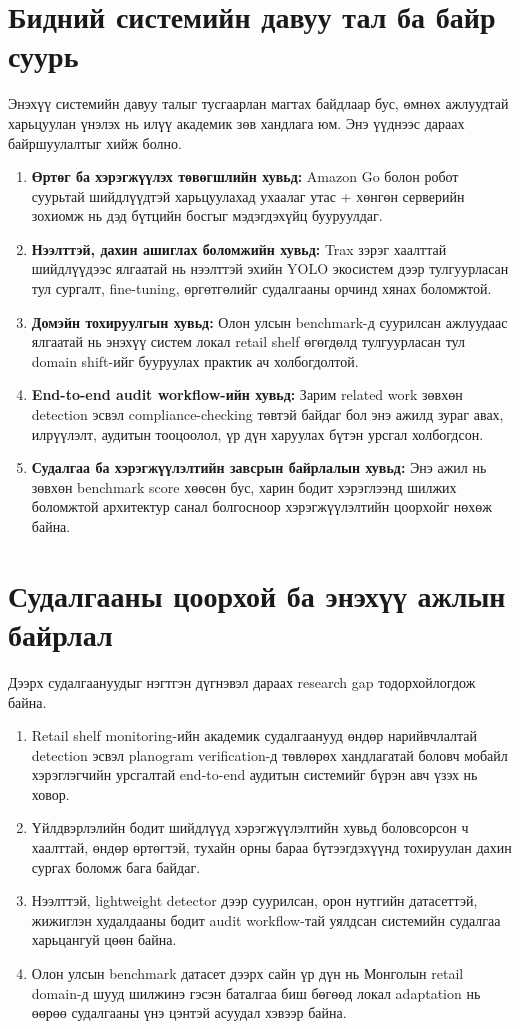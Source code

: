 \section{Бидний системийн давуу тал ба байр суурь}
Энэхүү системийн давуу талыг тусгаарлан магтах байдлаар бус, өмнөх ажлуудтай харьцуулан үнэлэх нь илүү академик зөв хандлага юм. Энэ үүднээс дараах байршуулалтыг хийж болно.

\begin{enumerate}
\item \textbf{Өртөг ба хэрэгжүүлэх төвөгшлийн хувьд:} Amazon Go болон робот суурьтай шийдлүүдтэй харьцуулахад ухаалаг утас + хөнгөн серверийн зохиомж нь дэд бүтцийн босгыг мэдэгдэхүйц бууруулдаг.
\item \textbf{Нээлттэй, дахин ашиглах боломжийн хувьд:} Trax зэрэг хаалттай шийдлүүдээс ялгаатай нь нээлттэй эхийн YOLO экосистем дээр тулгуурласан тул сургалт, fine-tuning, өргөтгөлийг судалгааны орчинд хянах боломжтой.
\item \textbf{Домэйн тохируулгын хувьд:} Олон улсын benchmark-д суурилсан ажлуудаас ялгаатай нь энэхүү систем локал retail shelf өгөгдөлд тулгуурласан тул domain shift-ийг бууруулах практик ач холбогдолтой.
\item \textbf{End-to-end audit workflow-ийн хувьд:} Зарим related work зөвхөн detection эсвэл compliance-checking төвтэй байдаг бол энэ ажилд зураг авах, илрүүлэлт, аудитын тооцоолол, үр дүн харуулах бүтэн урсгал холбогдсон.
\item \textbf{Судалгаа ба хэрэгжүүлэлтийн завсрын байрлалын хувьд:} Энэ ажил нь зөвхөн benchmark score хөөсөн бус, харин бодит хэрэглээнд шилжих боломжтой архитектур санал болгосноор хэрэгжүүлэлтийн цоорхойг нөхөж байна.
\end{enumerate}

\section{Судалгааны цоорхой ба энэхүү ажлын байрлал}
Дээрх судалгаануудыг нэгтгэн дүгнэвэл дараах research gap тодорхойлогдож байна.

\begin{enumerate}
\item Retail shelf monitoring-ийн академик судалгаанууд өндөр нарийвчлалтай detection эсвэл planogram verification-д төвлөрөх хандлагатай боловч мобайл хэрэглэгчийн урсгалтай end-to-end аудитын системийг бүрэн авч үзэх нь ховор.
\item Үйлдвэрлэлийн бодит шийдлүүд хэрэгжүүлэлтийн хувьд боловсорсон ч хаалттай, өндөр өртөгтэй, тухайн орны бараа бүтээгдэхүүнд тохируулан дахин сургах боломж бага байдаг.
\item Нээлттэй, lightweight detector дээр суурилсан, орон нутгийн датасеттэй, жижиглэн худалдааны бодит audit workflow-тай уялдсан системийн судалгаа харьцангуй цөөн байна.
\item Олон улсын benchmark датасет дээрх сайн үр дүн нь Монголын retail domain-д шууд шилжинэ гэсэн баталгаа биш бөгөөд локал adaptation нь өөрөө судалгааны үнэ цэнтэй асуудал хэвээр байна.
\end{enumerate}


